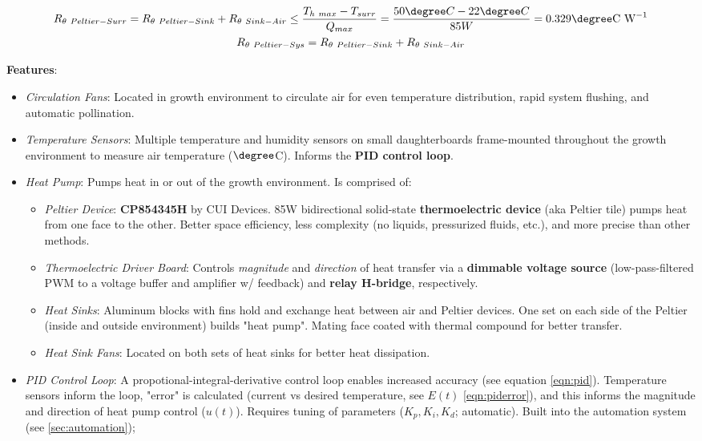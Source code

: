 \begin{gather}
    \label{eqn:thermalresistance-hot}
    R_{\theta~Peltier-Surr}=R_{\theta~Peltier-Sink}+R_{\theta~Sink-Air}\le\frac{T_{h~max} - T_{surr}}{Q_{max}}=\frac{50\degree C - 22\degree C}{85W}=0.329\degree \text{C W}^{-1}\\
    \label{eqn:thermalresistance-cold}
    R_{\theta~Peltier-Sys}=R_{\theta~Peltier-Sink}+R_{\theta~Sink-Air}
\end{gather}

\textbf{Features}:
\begin{itemize}
    \item \textit{Circulation Fans}: Located in growth environment to circulate air for even temperature distribution, rapid system flushing, and automatic pollination.
    \item \textit{Temperature Sensors}: Multiple temperature and humidity sensors \cite{sht31} on small daughterboards frame-mounted throughout the growth environment to measure air temperature ($\degree$C). Informs the \textbf{PID control loop}.
    \item \textit{Heat Pump}: Pumps heat in or out of the growth environment. Is comprised of:
    \begin{itemize}
        \item \textit{Peltier Device}: \textbf{CP854345H} by CUI Devices. 85W bidirectional solid-state \textbf{thermoelectric device} (aka Peltier tile) \cite{peltier} pumps heat from one face to the other. Better space efficiency, less complexity (no liquids, pressurized fluids, etc.), and more precise than other methods.
        \item \textit{Thermoelectric Driver Board}: Controls \textit{magnitude} and \textit{direction} of heat transfer via a \textbf{dimmable voltage source} (low-pass-filtered PWM to a voltage buffer and amplifier w/ feedback) and \textbf{relay H-bridge}, respectively.
        \item \textit{Heat Sinks}: Aluminum blocks with fins hold and exchange heat between air and Peltier devices. One set on each side of the Peltier (inside and outside environment) builds "heat pump". Mating face coated with thermal compound for better transfer.
        \item \textit{Heat Sink Fans}: Located on both sets of heat sinks for better heat dissipation.
    \end{itemize}
    \item \textit{PID Control Loop}: A propotional-integral-derivative control loop enables increased accuracy (see equation \ref{eqn:pid}). Temperature sensors inform the loop, "error" is calculated (current vs desired temperature, see $E(t)$ \ref{eqn:piderror}), and this informs the magnitude and direction of heat pump control ($u(t)$). Requires tuning of parameters ($K_p, K_i, K_d$; automatic). Built into the automation system (see \ref{sec:automation});
\end{itemize}

